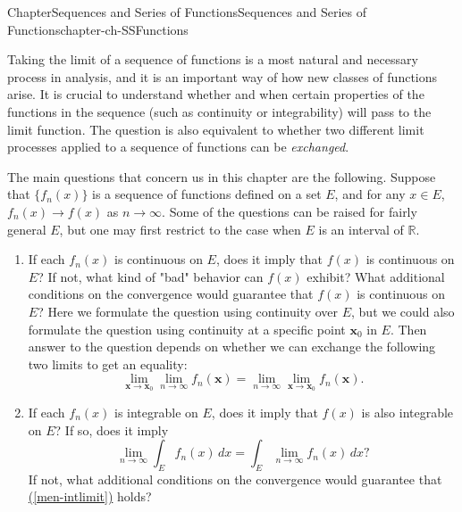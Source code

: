 \documentclass[oneside,10pt,]{book}
\newcommand{\xreffont}{\relax}
\numberwithin{equation}{section}
\newcommand{\bx}{\mathbf{x}}
\begin{document}
\begin{chapterptx}{Chapter}{Sequences and Series of Functions}{}{Sequences and Series of Functions}{}{}{chapter-ch-SSFunctions}
\renewcommand*{\chaptername}{Chapter}
\begin{introduction}{}%
Taking the limit of a sequence of functions is a most natural and necessary process in analysis, and it is an important way of how  new classes of functions arise. It is crucial to understand whether and when certain properties of the functions in the sequence (such as continuity or integrability) will pass to the limit function. The question is also equivalent to whether two different limit processes applied to a sequence of functions can be \emph{exchanged}.%
\par
The main questions that concern us in this chapter are the following. Suppose that \(\{ f_n(x)\}\) is a sequence of functions defined on a set \(E\), and for any \(x\in E\), \(f_n(x) \to f(x)\) as \(n\to \infty\). Some of the questions can be raised for fairly general \(E\), but one may first restrict to the case when \(E\) is an interval of \(\mathbb R\).%
\begin{enumerate}[label=(\alph*).]
\item{}If each \(f_n(x)\) is continuous on \(E\), does it imply that \(f(x)\) is continuous on \(E\)? If not, what kind of "bad" behavior	can \(f(x)\) exhibit? What additional conditions on the convergence would guarantee that \(f(x)\) is continuous on \(E\)? Here we formulate the question using continuity over \(E\), but we could also formulate the question using continuity at a specific point \(\bx_0\) in \(E\). Then answer to the question depends on whether we can exchange the following two limits to get an equality:%
\begin{equation*}
\lim_{\bx\to \bx_0} \lim_{n\to \infty} f_n(\bx)=  \lim_{n\to \infty} \lim_{\bx\to \bx_0} f_n(\bx)\text{.}
\end{equation*}
%
\item{}If each \(f_n(x)\) is integrable on \(E\), does it imply that \(f(x)\) is also integrable on \(E\)? If so, does it imply%
\begin{equation}
\lim_{n\to\infty} \int_{E} f_{n}(x)\, dx = \int_{E} \lim_{n\to\infty} f_{n}(x)\, dx\text{?}\label{men-intlimit}
\end{equation}
If not, what additional conditions on the convergence would guarantee that \hyperref[men-intlimit]{({\xreffont\ref{men-intlimit}})} holds?%
\end{enumerate}
%
\end{introduction}%

\end{chapterptx}
\end{document}
